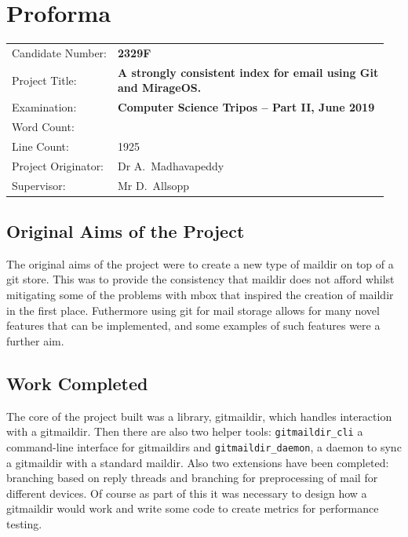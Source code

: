 \documentclass[12pt,a4paper,twoside,openright]{report}
\begin{document}
\medskip
{}

\chapter*{Proforma}

\begin{adjustbox}{width={\textwidth},totalheight={\textheight},keepaspectratio}%
{\large
\begin{tabular}{ll}
Candidate Number:   & \bf 2329F \\
Project Title:      & \makecell[l]{\bf A strongly consistent index for email using Git \\ \bf and MirageOS.} \\
Examination:        & \bf Computer Science Tripos -- Part II, June 2019 \\
Word Count:         & \bf \footnotemark[1] \\
Line Count:         & 1925\footnotemark[2] \\
Project Originator: & Dr A.~Madhavapeddy \\
Supervisor:         & Mr D.~Allsopp \\
\end{tabular}
}
\end{adjustbox}



\section*{Original Aims of the Project}

The original aims of the project were to create a new type of maildir on top of a git store. This was to provide the consistency that maildir does not afford whilst mitigating some of the problems with mbox that inspired the creation of maildir in the first place. Futhermore using git for mail storage allows for many novel features that can be implemented, and some examples of such features were a further aim.

\section*{Work Completed}

The core of the project built was a library, gitmaildir, which handles interaction with a gitmaildir. Then there are also two helper tools: \texttt{gitmaildir\_cli} a command-line interface for gitmaildirs and \texttt{gitmaildir\_daemon}, a daemon to sync a gitmaildir with a standard maildir. Also two extensions have been completed: branching based on reply threads and branching for preprocessing of mail for different devices. Of course as part of this it was necessary to design how a gitmaildir would work and write some code to create metrics for performance testing.
\end{document}
